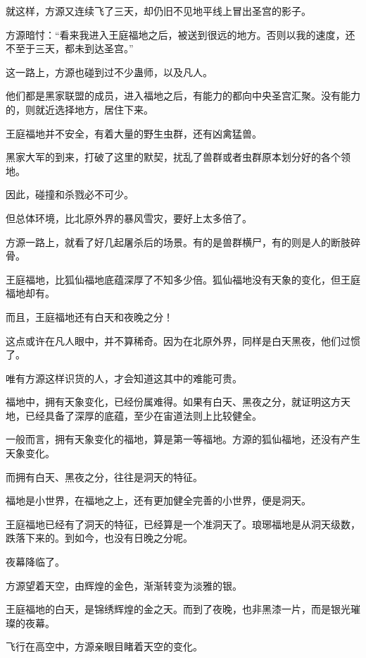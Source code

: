 
\begin{this_body}



就这样，方源又连续飞了三天，却仍旧不见地平线上冒出圣宫的影子。

方源暗忖：“看来我进入王庭福地之后，被送到很远的地方。否则以我的速度，还不至于三天，都未到达圣宫。”

这一路上，方源也碰到过不少蛊师，以及凡人。

他们都是黑家联盟的成员，进入福地之后，有能力的都向中央圣宫汇聚。没有能力的，则就近选择地方，居住下来。

王庭福地并不安全，有着大量的野生虫群，还有凶禽猛兽。

黑家大军的到来，打破了这里的默契，扰乱了兽群或者虫群原本划分好的各个领地。

因此，碰撞和杀戮必不可少。

但总体环境，比北原外界的暴风雪灾，要好上太多倍了。

方源一路上，就看了好几起屠杀后的场景。有的是兽群横尸，有的则是人的断肢碎骨。

王庭福地，比狐仙福地底蕴深厚了不知多少倍。狐仙福地没有天象的变化，但王庭福地却有。

而且，王庭福地还有白天和夜晚之分！

这点或许在凡人眼中，并不算稀奇。因为在北原外界，同样是白天黑夜，他们过惯了。

唯有方源这样识货的人，才会知道这其中的难能可贵。

福地中，拥有天象变化，已经份属难得。如果有白天、黑夜之分，就证明这方天地，已经具备了深厚的底蕴，至少在宙道法则上比较健全。

一般而言，拥有天象变化的福地，算是第一等福地。方源的狐仙福地，还没有产生天象变化。

而拥有白天、黑夜之分，往往是洞天的特征。

福地是小世界，在福地之上，还有更加健全完善的小世界，便是洞天。

王庭福地已经有了洞天的特征，已经算是一个准洞天了。琅琊福地是从洞天级数，跌落下来的。到如今，也没有日晚之分呢。

夜幕降临了。

方源望着天空，由辉煌的金色，渐渐转变为淡雅的银。

王庭福地的白天，是锦绣辉煌的金之天。而到了夜晚，也非黑漆一片，而是银光璀璨的夜幕。

飞行在高空中，方源亲眼目睹着天空的变化。


\end{this_body}
